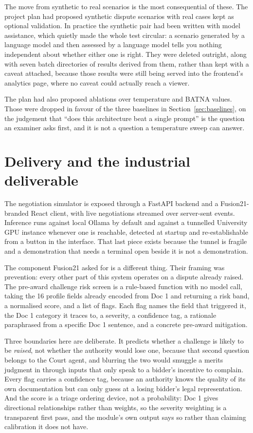 The move from synthetic to real scenarios is the most consequential of these.
The project plan had proposed synthetic dispute scenarios with real cases kept as
optional validation. In practice the synthetic pair had been written with model
assistance, which quietly made the whole test circular: a scenario generated by
a language model and then assessed by a language model tells you nothing
independent about whether either one is right. They were deleted outright,
along with seven batch directories of results derived from them, rather than
kept with a caveat attached, because those results were still being served into
the frontend's analytics page, where no caveat could actually reach a viewer.

The plan had also proposed ablations over temperature and BATNA values. Those
were dropped in favour of the three baselines in Section~\ref{sec:baselines}, on
the judgement that ``does this architecture beat a single prompt'' is the
question an examiner asks first, and it is not a question a temperature sweep
can answer.

\section{Delivery and the industrial deliverable}
\label{sec:risk-screen}

The negotiation simulator is exposed through a FastAPI backend and a
Fusion21-branded React client, with live negotiations streamed over
server-sent events. Inference runs against local Ollama by default and against a
tunnelled University GPU instance whenever one is reachable, detected at startup
and re-establishable from a button in the interface. That last piece exists
because the tunnel is fragile and a demonstration that needs a
terminal open beside it is not a demonstration.

The component Fusion21 asked for is a different thing. Their framing was
prevention: every other part of this system operates on a dispute already raised.
The pre-award challenge risk screen is a rule-based function with no model call,
taking the 16 profile fields already encoded from Doc 1 and returning a risk band,
a normalised score, and a list of flags. Each flag names the field that triggered
it, the Doc 1 category it traces to, a severity, a confidence tag, a rationale
paraphrased from a specific Doc 1 sentence, and a concrete pre-award mitigation.

Three boundaries here are deliberate. It predicts whether a challenge is likely
to be \emph{raised}, not whether the authority would lose one, because that second
question belongs to the Court agent, and blurring the two would smuggle a merits
judgment in through inputs that only speak to a bidder's incentive to complain.
Every flag carries a confidence tag, because an authority knows the quality of its
own documentation but can only guess at a losing bidder's legal representation.
And the score is a triage ordering device, not a probability: Doc 1 gives
directional relationships rather than weights, so the severity weighting is a
transparent first pass, and the module's own output says so rather than claiming
calibration it does not have.

